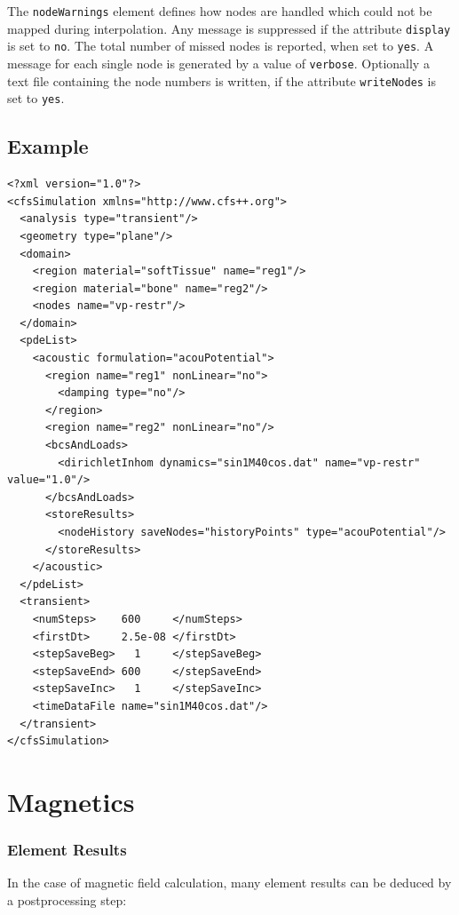 The \texttt{nodeWarnings} element defines how nodes are handled which could not
be mapped during interpolation. Any message is suppressed if the attribute
\texttt{display} is set to \texttt{no}. The total number of missed nodes is
reported, when set to \texttt{yes}. A message for each single node is generated
by a value of \texttt{verbose}. Optionally a text file containing the node
numbers is written, if the attribute \texttt{writeNodes} is set to \texttt{yes}.

\subsection{Example}

{\footnotesize 
\begin{verbatim}
<?xml version="1.0"?>
<cfsSimulation xmlns="http://www.cfs++.org">
  <analysis type="transient"/>
  <geometry type="plane"/>
  <domain>
    <region material="softTissue" name="reg1"/>
    <region material="bone" name="reg2"/>
    <nodes name="vp-restr"/>
  </domain>
  <pdeList>
    <acoustic formulation="acouPotential">
      <region name="reg1" nonLinear="no">
        <damping type="no"/>
      </region>
      <region name="reg2" nonLinear="no"/>
      <bcsAndLoads>
        <dirichletInhom dynamics="sin1M40cos.dat" name="vp-restr" value="1.0"/>
      </bcsAndLoads>
      <storeResults>
        <nodeHistory saveNodes="historyPoints" type="acouPotential"/>
      </storeResults>
    </acoustic>
  </pdeList>
  <transient>
    <numSteps>    600     </numSteps>
    <firstDt>     2.5e-08 </firstDt>
    <stepSaveBeg>   1     </stepSaveBeg>
    <stepSaveEnd> 600     </stepSaveEnd>
    <stepSaveInc>   1     </stepSaveInc>
    <timeDataFile name="sin1M40cos.dat"/>
  </transient>
</cfsSimulation>
\end{verbatim}
}


\newpage
\section{Magnetics}
\subsubsection{Element Results}
In the case of magnetic field calculation, many element results can be
deduced by a postprocessing step:

